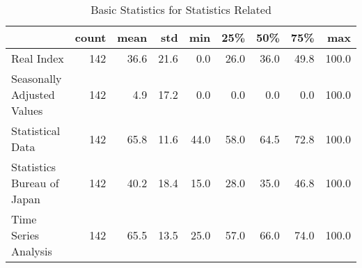 \documentclass[a4paper,12pt]{article}
\begin{document}
        
        \begin{landscape}
        \begin{table}
\caption{Basic Statistics for Statistics Related}
\label{tab:statistics_Statistics_Related}
\begin{tabular}{lrrrrrrrr}
\toprule
 & count & mean & std & min & 25\% & 50\% & 75\% & max \\
\midrule
Real Index & 142 & 36.6 & 21.6 & 0.0 & 26.0 & 36.0 & 49.8 & 100.0 \\
Seasonally Adjusted Values & 142 & 4.9 & 17.2 & 0.0 & 0.0 & 0.0 & 0.0 & 100.0 \\
Statistical Data & 142 & 65.8 & 11.6 & 44.0 & 58.0 & 64.5 & 72.8 & 100.0 \\
Statistics Bureau of Japan & 142 & 40.2 & 18.4 & 15.0 & 28.0 & 35.0 & 46.8 & 100.0 \\
Time Series Analysis & 142 & 65.5 & 13.5 & 25.0 & 57.0 & 66.0 & 74.0 & 100.0 \\
\bottomrule
\end{tabular}
\end{table}

        \end{landscape}
        
        
\end{document}
